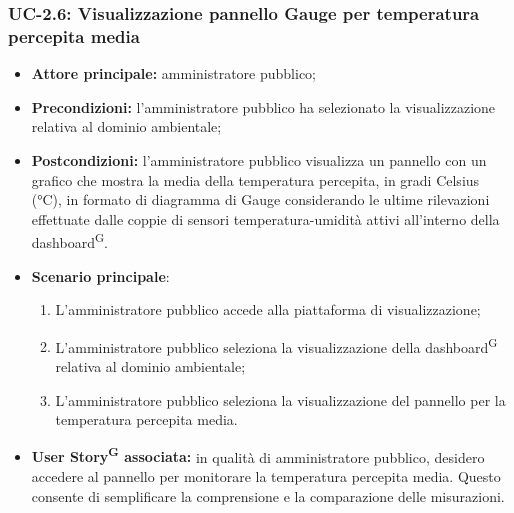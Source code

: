 \documentclass[8pt]{article}
\newcommand{\glossterm}[1]{#1\textsuperscript{G}} %
\begin{document}
\subsubsection*{UC-2.6: Visualizzazione pannello Gauge per temperatura percepita media}
\begin{itemize}
    \item \textbf{Attore principale:} amministratore pubblico;
    \item \textbf{Precondizioni: }l'amministratore pubblico ha selezionato la visualizzazione
        relativa al dominio ambientale;
    \item \textbf{Postcondizioni:} l'amministratore pubblico visualizza un pannello con un grafico che mostra la media della temperatura percepita, in gradi Celsius (°C), in formato di diagramma di Gauge considerando le ultime rilevazioni effettuate dalle coppie di sensori temperatura-umidità attivi all'interno della \glossterm{dashboard}.
    \item \textbf{Scenario principale}:
    \begin{enumerate}
    \item L’amministratore pubblico accede alla piattaforma di visualizzazione;
    \item L’amministratore pubblico seleziona la visualizzazione della \glossterm{dashboard} relativa al dominio
        ambientale; 
    \item L’amministratore pubblico seleziona la visualizzazione del pannello per la temperatura percepita
        media.
    \end{enumerate}
\item \textbf{\glossterm{User Story} associata:} in qualità di amministratore pubblico, desidero accedere al pannello per monitorare la temperatura percepita media. Questo consente di semplificare la comprensione e la comparazione delle misurazioni.
\end{itemize}
\end{document}
